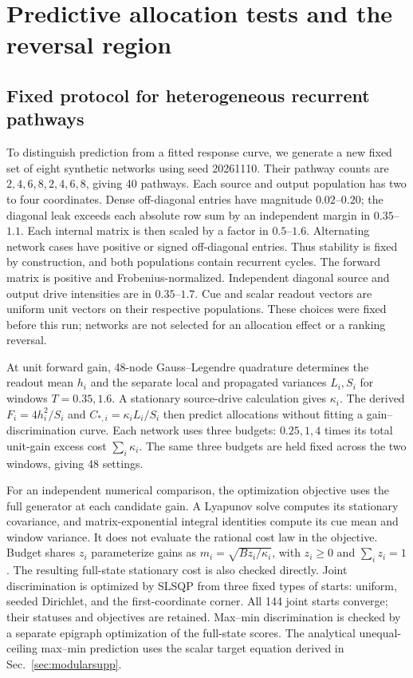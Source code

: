 \section{Predictive allocation tests and the reversal region}
\label{sec:predictivetests}

\subsection{Fixed protocol for heterogeneous recurrent pathways}

To distinguish prediction from a fitted response curve, we generate
a new fixed set of eight synthetic networks using seed 20261110.
Their pathway counts are \(2,4,6,8,2,4,6,8\), giving 40 pathways.
Each source and output population has two to four coordinates.
Dense off-diagonal entries have magnitude \(0.02\)--\(0.20\);
the diagonal leak exceeds each absolute row sum by an independent
margin in \(0.35\)--\(1.1\). Each internal matrix is then scaled
by a factor in \(0.5\)--\(1.6\). Alternating network cases have
positive or signed off-diagonal entries. Thus stability is fixed
by construction, and both populations contain recurrent cycles.
The forward matrix is positive and Frobenius-normalized.
Independent diagonal source and output drive intensities are in
\(0.35\)--\(1.7\). Cue and scalar readout vectors are uniform
unit vectors on their respective populations. These choices were
fixed before this run; networks are not selected for an allocation
effect or a ranking reversal.

At unit forward gain, 48-node Gauss--Legendre quadrature determines
the readout mean \(h_i\) and the separate local and propagated
variances \(L_i,S_i\) for windows \(T=0.35,1.6\). A stationary
source-drive calculation gives \(\kappa_i\). The derived
\(F_i=4h_i^2/S_i\) and \(C_{*,i}=\kappa_iL_i/S_i\) then predict
allocations without fitting a gain--discrimination curve.
Each network uses three budgets: \(0.25,1,4\) times its total
unit-gain excess cost \(\sum_i\kappa_i\). The same three budgets
are held fixed across the two windows, giving 48 settings.

For an independent numerical comparison, the optimization objective
uses the full generator at each candidate gain. A Lyapunov solve
computes its stationary covariance, and matrix-exponential integral
identities compute its cue mean and window variance. It does not
evaluate the rational cost law in the objective. Budget shares
\(z_i\) parameterize gains as
\(m_i=\sqrt{Bz_i/\kappa_i}\), with \(z_i\ge0\) and
\(\sum_i z_i=1\). The resulting full-state stationary cost is
also checked directly. Joint discrimination is optimized by SLSQP
from three fixed types of starts: uniform, seeded Dirichlet, and
the first-coordinate corner. All 144 joint starts converge; their
statuses and objectives are retained. Max--min discrimination is
checked by a separate epigraph optimization of the full-state
scores. The analytical unequal-ceiling max--min prediction uses
the scalar target equation derived in Sec.~\ref{sec:modularsupp}.

